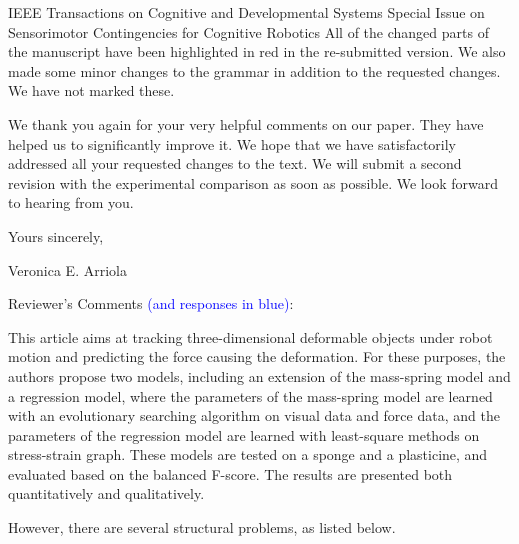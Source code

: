 \documentclass[a4paper,12pt]{letter}
\newcommand{\comment}[1]{\textcolor{blue}{#1}}
\newcommand{\marker}{\hspace*{-1.6em}\textcolor{red}{$\Longrightarrow$}}
\begin{document}
\begin{letter}{IEEE Transactions on Cognitive and Developmental Systems\newline
Special Issue on Sensorimotor Contingencies for Cognitive Robotics}
All of the changed parts of the manuscript have been highlighted in red in the re-submitted version. We also made some minor changes to the grammar in addition to the requested changes. We have not marked these.

We thank you again for your very helpful comments on our paper. They have helped us to significantly improve it. We hope that we have satisfactorily addressed all your requested changes to the text. We will submit a second revision with the experimental comparison as soon as possible. We look forward to hearing from you.


\signature{Dra. Verónica Esther Arriola Ríos\\
Profesora Asociada C de T.C.\newline
Departamento de Matemáticas, Cub 119.\newline
Facultad de Ciencias, UNAM \newline
v.arriola@ciencias.unam.mx \newline
+(52)55 5622 5426}

\closing{Yours sincerely,}

Veronica E. Arriola

\newpage

Reviewer's Comments \comment{(and responses in blue)}: 

This article aims at tracking three-dimensional deformable objects under robot motion and predicting the force causing the deformation.
%
For these purposes, the authors propose two models, including an extension of the mass-spring model and a regression model, where the parameters of the mass-spring model are learned with an evolutionary searching algorithm on visual data and force data, and the parameters of the regression model are learned with least-square methods on stress-strain graph. These models are tested on a sponge and a plasticine, and evaluated based on the balanced F-score. The results are presented both quantitatively and qualitatively. 

However, there are several structural problems, as listed below. 


\end{letter}
\end{document}
